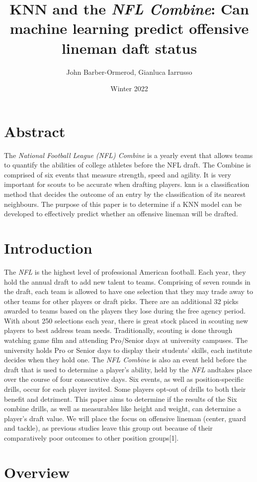 \documentclass[confrence]{IEEEtran}
\title{KNN and the \textit{NFL Combine}: Can machine learning predict offensive lineman daft status}
\author{John Barber-Ormerod, Gianluca Iarrusso}
\date{Winter 2022}
\begin{document}
\maketitle
\section*{Abstract}
The \textit{National Football League (NFL) Combine} is a yearly event that allows teams to quantify the abilities of college athletes before the NFL draft.
The Combine is comprised of six events that measure strength, speed and agility.
It is very important for scouts to be accurate when drafting players.
knn is a classification method that decides the outcome of an entry by the classification of its nearest neighbours.
The purpose of this paper is to determine if a KNN model can be developed to effectively predict whether an offensive lineman will be drafted.
\section*{Introduction}
The \textit{NFL} is the highest level of professional American football. Each year, they hold the annual draft to add new talent to teams.
Comprising of seven rounds in the draft, each team is allowed to have one selection that they may trade away to other teams for other players or draft picks.
There are an additional 32 picks awarded to teams based on the players they lose during the free agency period.
With about 250 selections each year, there is great stock placed in scouting new players to best address team needs.
Traditionally, scouting is done through watching game film and attending Pro/Senior days at university campuses.
The university holds Pro or Senior days to display their students' skills, each institute decides when they hold one.
The \textit{NFL Combine} is also an event held before the draft that is used to determine a player's ability, held by the \textit{NFL} andtakes place over the course of four consecutive days. 
Six events, as well as position-specific drills, occur for each player invited.
Some players opt-out of drills to both their benefit and detriment.
This paper aims to determine if the results of the Six combine drills, as well as measurables like height and weight, can determine a player's draft value.
We will place the focus on offensive lineman (center, guard and tackle), as previous studies leave this group out because of their comparatively poor outcomes to other position groups[1].
\section*{Overview}
\end{document}
